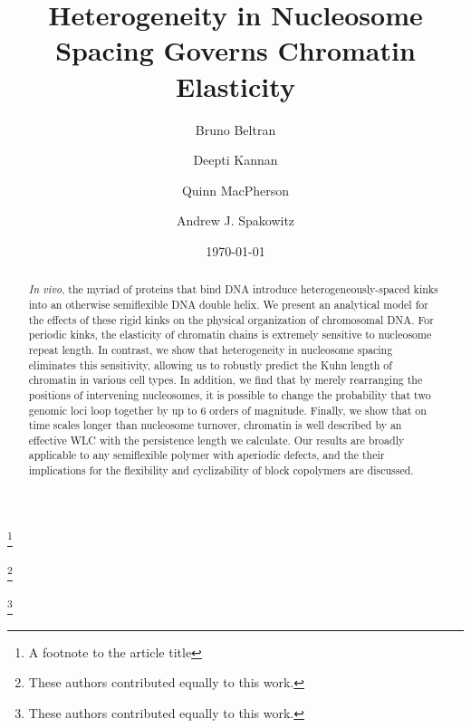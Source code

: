 \documentclass[%
 reprint,
superscriptaddress,
showpacs,preprintnumbers,
 amsmath,amssymb,
 aps,
 prl,
]{revtex4-1}
\begin{document}
\title{Heterogeneity in Nucleosome Spacing Governs Chromatin Elasticity}%
\thanks{A footnote to the article title}%

\author{Bruno Beltran}
\thanks{These authors contributed equally to this work.}%
%
\author{Deepti Kannan}%
\thanks{These authors contributed equally to this work.}%
\author{Quinn MacPherson}%
%
\author{Andrew J. Spakowitz}%
%
%
%
%
\date{\today}%

\begin{abstract}
\textit{In vivo}, the myriad of proteins that bind DNA introduce heterogeneously-spaced
    kinks into an otherwise semiflexible DNA double helix.
We present an analytical model for the effects of these rigid kinks on the
    physical organization of chromosomal DNA\@.
For periodic kinks, the elasticity of chromatin chains is extremely sensitive to
    nucleosome repeat length.
In contrast, we show that heterogeneity in nucleosome spacing eliminates this
    sensitivity, allowing us to robustly predict the Kuhn length of chromatin in
    various cell types.
In addition, we find that by merely rearranging the positions of intervening
    nucleosomes, it is possible to change the probability that two genomic
    loci loop together by up to 6 orders of magnitude.
Finally, we show that on time scales longer than nucleosome turnover, chromatin
    is well described by an effective WLC with the persistence length we
    calculate.
Our results are broadly applicable to any semiflexible polymer with aperiodic
    defects, and the their implications for the flexibility and cyclizability of
    block copolymers are discussed.
\end{abstract}
\end{document}
